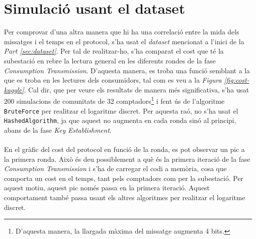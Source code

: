 \section{Simulació usant el dataset}
Per comprovar d'una altra manera que hi ha una correlació entre la mida dels missatges i el temps en el protocol, s'ha usat el \textit{dataset} mencionat a l'inici de la \textit{Part \ref{sec:dataset}}. Per tal de realitzar-ho, s'ha comparat el cost que té la subestació en rebre la lectura general en les diferents rondes de la fase \textit{Consumption Transmission}. D'aquesta manera, es troba una funció semblant a la que es troba en les lectures dels consumidors, tal com es veu a la \textit{Figura \ref{fig:cost-kaggle}}. Cal dir, que per veure els resultats de manera més significativa, s'ha usat $200$ simulacions de comunitats de $32$ comptadors\footnote{D'aquesta manera, la llargada màxima del missatge augmenta 4 bits.} i fent ús de l'algoritme \texttt{BruteForce} per realitzar el logaritme discret. Per aquesta raó, no s'ha usat el \texttt{HashedAlgorithm}, ja que aquest no augmenta en cada ronda sinó al principi, abans de la fase \textit{Key Establishment}.
\\
\\
En el gràfic del cost del protocol en funció de la ronda, es pot observar un pic a la primera ronda. Això és deu possiblement a què és la primera iteració de la fase \textit{Consumption Transmission} i s'ha de carregar el codi a memòria, cosa que comporta un cost en el temps, tant pels comptadors com per la subestació. Per aquest motiu, aquest pic només passa en la primera iteració. Aquest comportament també passa usant els altres algoritmes per realitzar el logaritme discret.
